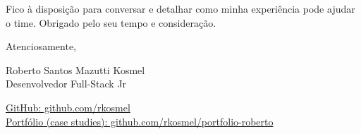 \documentclass{article}
\begin{document}
\vspace{4mm}

Fico à disposição para conversar e detalhar como minha experiência pode ajudar o time. Obrigado pelo seu tempo e consideração.

\vspace{6mm}

Atenciosamente,

\vspace{4mm}

Roberto Santos Mazutti Kosmel \\
Desenvolvedor Full-Stack Jr \\

\vspace{4mm}

\href{https://github.com/rkosmel}{GitHub: github.com/rkosmel} \\
\href{https://github.com/rkosmel/portfolio-roberto}{Portfólio (case studies): github.com/rkosmel/portfolio-roberto}
\end{document}
